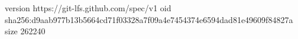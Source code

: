 version https://git-lfs.github.com/spec/v1
oid sha256:d9aab977b13b5664cd71f03328a7f09a4e7454374e6594dad81e49609f84827a
size 262240
